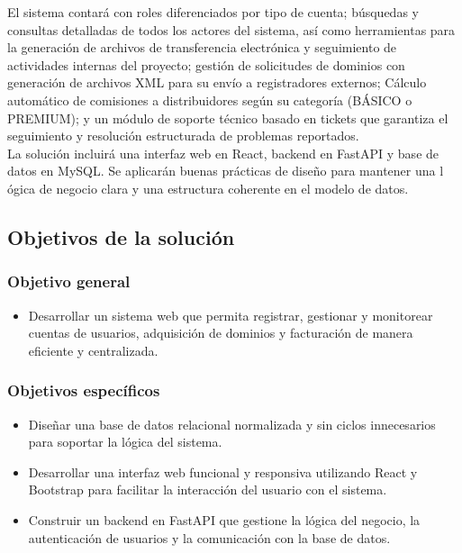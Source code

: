 El sistema contará con roles diferenciados por tipo de cuenta; búsquedas y consultas detalladas de todos los actores del sistema, así como herramientas para la generación de archivos de transferencia electrónica y seguimiento de actividades internas del proyecto; gestión de solicitudes de dominios con generación de archivos XML para su envío a registradores externos; Cálculo automático de comisiones a distribuidores según su categoría (BÁSICO o PREMIUM); y un módulo de soporte técnico basado en tickets que garantiza el seguimiento y resolución estructurada de problemas reportados.\\

La solución incluirá una interfaz web en React, backend en FastAPI y base de datos en MySQL. Se aplicarán buenas prácticas de diseño para mantener una l ógica de negocio clara y una estructura coherente en el modelo de datos.

\subsection{Objetivos de la solución}

\subsubsection{Objetivo general}
\begin{itemize}
	\item Desarrollar un sistema web que permita registrar, gestionar y monitorear cuentas de usuarios, adquisición de dominios y facturación de manera eficiente y centralizada.

\end{itemize}

\subsubsection{Objetivos específicos}
\begin{itemize}
\item Diseñar una base de datos relacional normalizada y sin ciclos innecesarios para soportar la lógica del sistema.
\item Desarrollar una interfaz web funcional y responsiva utilizando React y Bootstrap para facilitar la interacción del usuario con el sistema.
\item Construir un backend en FastAPI que gestione la lógica del negocio, la autenticación de usuarios y la comunicación con la base de datos.
\end{itemize}

